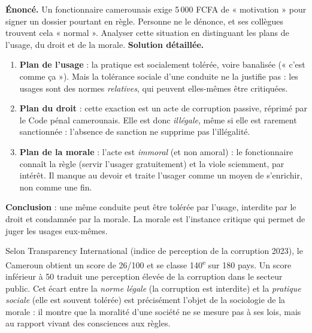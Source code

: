 \documentclass[11pt]{article}
\begin{document}
\begin{exoresolu}
\textbf{Énoncé.} Un fonctionnaire camerounais exige 5\,000 FCFA de « motivation » pour signer un dossier pourtant en règle. Personne ne le dénonce, et ses collègues trouvent cela « normal ». Analyser cette situation en distinguant les plans de l'usage, du droit et de la morale.
\tcblower
\textbf{Solution détaillée.}
\begin{enumerate}
\item \textbf{Plan de l'usage} : la pratique est socialement tolérée, voire banalisée (« c'est comme ça »). Mais la tolérance sociale d'une conduite ne la justifie pas : les usages sont des normes \emph{relatives}, qui peuvent elles-mêmes être critiquées.
\item \textbf{Plan du droit} : cette exaction est un acte de corruption passive, réprimé par le Code pénal camerounais. Elle est donc \emph{illégale}, même si elle est rarement sanctionnée : l'absence de sanction ne supprime pas l'illégalité.
\item \textbf{Plan de la morale} : l'acte est \emph{immoral} (et non amoral) : le fonctionnaire connaît la règle (servir l'usager gratuitement) et la viole sciemment, par intérêt. Il manque au devoir et traite l'usager comme un moyen de s'enrichir, non comme une fin.
\end{enumerate}
\textbf{Conclusion} : une même conduite peut être tolérée par l'usage, interdite par le droit et condamnée par la morale. La morale est l'instance critique qui permet de juger les usages eux-mêmes.
\end{exoresolu}

\begin{exemplebox}
Selon Transparency International (indice de perception de la corruption 2023), le Cameroun obtient un score de 26/100 et se classe 140\textsuperscript{e} sur 180 pays. Un score inférieur à 50 traduit une perception élevée de la corruption dans le secteur public. Cet écart entre la \emph{norme légale} (la corruption est interdite) et la \emph{pratique sociale} (elle est souvent tolérée) est précisément l'objet de la sociologie de la morale : il montre que la moralité d'une société ne se mesure pas à ses lois, mais au rapport vivant des consciences aux règles.
\end{exemplebox}
\end{document}
